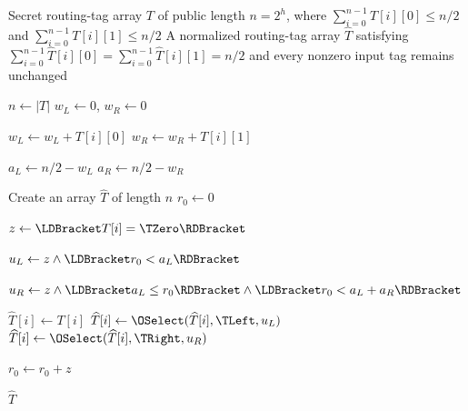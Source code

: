 \begin{algorithm}[t]
\caption{$\OFRNormalize(T)$}
\label{alg:ofr-normalize}
\begin{algorithmic}[1]
\Require Secret routing-tag array $T$ of public length $n=2^h$,
where $\sum_{i=0}^{n-1} T[i][0]\leq n/2$ and $\sum_{i=0}^{n-1} T[i][1]\leq n/2 $
\Ensure A normalized routing-tag array $\widehat{T}$ satisfying
$\sum_{i=0}^{n-1}\widehat{T}[i][0] = \sum_{i=0}^{n-1}\widehat{T}[i][1] = n/2 $
and every nonzero input tag remains unchanged

\State $n\gets |T|$
\State $w_L\gets 0$, $w_R\gets 0$

    \State $w_L\gets w_L+T[i][0]$
    \State $w_R\gets w_R+T[i][1]$
\EndFor

\State $a_L\gets n/2-w_L$
\State $a_R\gets n/2-w_R$

\State Create an array $\widehat{T}$ of length $n$
\State $r_0\gets 0$

    \State $z\gets\LDBracket T[i]=\TZero\RDBracket$

    \State $u_L\gets
           z\land
           \LDBracket r_0<a_L\RDBracket$

    \State $u_R\gets
           z\land
           \LDBracket a_L\leq r_0\RDBracket
           \land
           \LDBracket r_0<a_L+a_R\RDBracket$

    \State $\widehat{T}[i]\gets T[i]$
    \State $\widehat{T}[i]\gets
           \OSelect(\widehat{T}[i],\TLeft,u_L)$
    \State $\widehat{T}[i]\gets
           \OSelect(\widehat{T}[i],\TRight,u_R)$

    \State $r_0\gets r_0+z$
\EndFor

\State \Return $\widehat{T}$
\end{algorithmic}
\end{algorithm}


